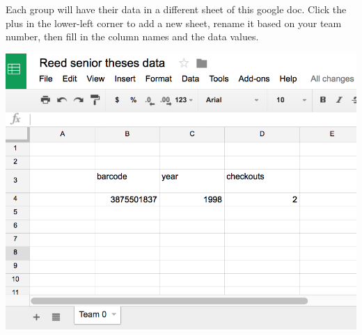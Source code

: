 \documentclass[10pt]{article}\usepackage[]{graphicx}\usepackage[]{color}
\begin{document}
Each group will have their data in a different sheet of this google doc. Click the plus in the lower-left corner to add a new sheet, rename it based on your team number, then fill in the column names and the data values.

\vspace{10mm}

\includegraphics[scale=.5]{senior-thesis-sheets.png}
\end{document}
